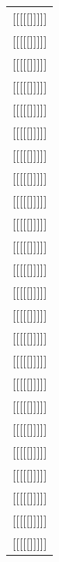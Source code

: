 \documentclass{article}
\newcounter{z}
\def\z{\stepcounter{z}[[[[[\thez]]]]]}
\begin{document}
\begin{landscape}
\begin{longtable}{l}
\z\\\z\\\z\\\z\\\z\\\z\\\z\\\z\\\z\\\z\\\z\\\z\\
\z\\\z\\\z\\\z\\\z\\\z\\\z\\\z\\\z\\\z\\\z\\\z\\
\end{longtable}
\end{landscape}
\end{document}

